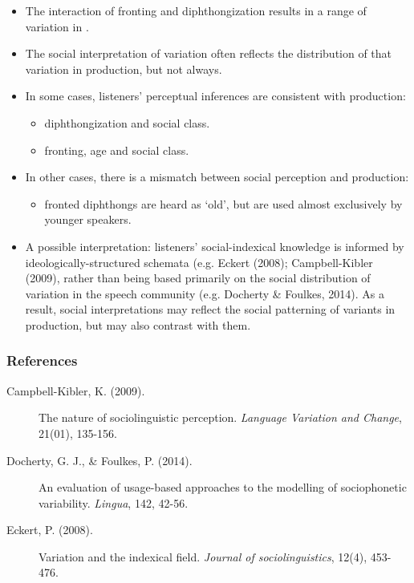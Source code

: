 \documentclass[a0,portrait]{a0poster}
\begin{document}
\begin{multicols*}{3}
\begin{itemize}
\item{The interaction of fronting and diphthongization results in a range of variation in .}
\item{The social interpretation of  variation often reflects the distribution of that variation in production, but not always.}
\item{In some cases, listeners' perceptual inferences are consistent with production:\begin{itemize}\item{diphthongization and social class.}\item{fronting, age and social class.}\end{itemize}}
\item{In other cases, there is a mismatch between social perception and production:\begin{itemize}\item{fronted diphthongs are heard as `old', but are used almost exclusively by younger speakers.}\end{itemize}}
\item{A possible interpretation: listeners' social-indexical knowledge is informed by ideologically-structured schemata (e.g. Eckert (2008); Campbell-Kibler (2009), rather than being based primarily on the social distribution of variation in the speech community (e.g. Docherty \& Foulkes, 2014). As a result, social interpretations may reflect the social patterning of variants in production, but may also contrast with them.}

\end{itemize}

\subsubsection*{References}
\footnotesize
\begin{description}

\item[Campbell-Kibler, K. (2009).]{The nature of sociolinguistic perception. \textit{Language Variation and Change}, 21(01), 135-156.}

\item[Docherty, G. J., \& Foulkes, P. (2014).]{An evaluation of usage-based approaches to the modelling of sociophonetic variability. \textit{Lingua}, 142, 42-56.}

\item[Eckert, P. (2008).]{Variation and the indexical field. \textit{Journal of sociolinguistics}, 12(4), 453-476.}\vspace*{0.2cm}


\end{description}
\end{multicols*}
\end{document}
